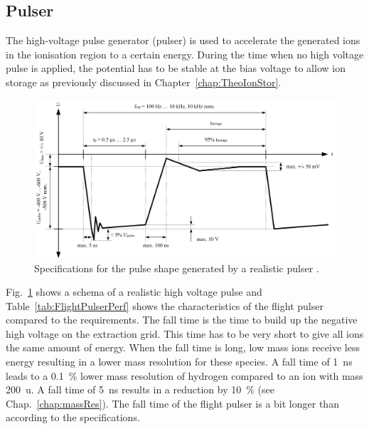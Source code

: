 	\subsection{Pulser} \label{chap:ExpPulser} %
	The high-voltage pulse generator (pulser) is used to accelerate the generated ions in the ionisation region to a certain energy. During the time when no high voltage pulse is applied, the potential has to be stable at the bias voltage to allow ion storage as previously discussed in Chapter~\ref{chap:TheoIonStor}.\\
	\begin{figure}[H]
		\centering
		\includegraphics[width=\textwidth]{Bilder/Pulser_theretical_shape.jpg}
		\caption{Specifications for the pulse shape generated by a realistic pulser \cite{Diss_Meyer}.}
		\label{fig:PulserTheoCurve}
	\end{figure}
	Fig.~\ref{fig:PulserTheoCurve} shows a schema of a realistic high voltage pulse and Table~\ref{tab:FlightPulserPerf} shows the characteristics of the flight pulser compared to the requirements. The fall time is the time to build up the negative high voltage on the extraction grid. This time has to be very short to give all ions the same amount of energy. When the fall time is long, low mass ions receive less energy resulting in a lower mass resolution for these species. A fall time of 1~ns leads to a 0.1~\% lower mass resolution of hydrogen compared to an ion with mass 200~u. A fall time of 5~ns results in a reduction by 10~\% (see Chap.~\ref{chap:massRes}). The fall time of the flight pulser is a bit longer than according to the specifications.\\
